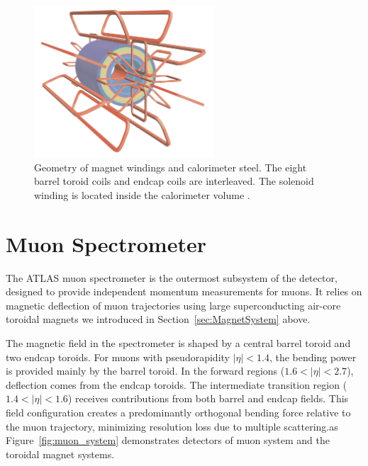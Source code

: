 \begin{figure}[htbp]
  \centering
  \includegraphics[width=0.6\textwidth]{figs/chapter2/magnet_windings.png}
  \caption{Geometry of magnet windings and calorimeter steel. The eight barrel toroid coils and endcap coils are interleaved. The solenoid winding is located inside the calorimeter volume \cite{ATLASDetector2008}.}
  \label{fig:magnet_windings}
\end{figure}

\section{Muon Spectrometer} \label{sec:MuonSpectrometer}
The ATLAS muon spectrometer is the outermost subsystem of the detector, designed to provide independent momentum measurements for muons. It relies on magnetic deflection of muon trajectories using large superconducting air-core toroidal magnets we introduced in Section~\ref{sec:MagnetSystem} above.

The magnetic field in the spectrometer is shaped by a central barrel toroid and two endcap toroids. For muons with pseudorapidity $|\eta| < 1.4$, the bending power is provided mainly by the barrel toroid. In the forward regions ($1.6 < |\eta| < 2.7$), deflection comes from the endcap toroids. The intermediate transition region ($1.4 < |\eta| < 1.6$) receives contributions from both barrel and endcap fields. This field configuration creates a predominantly orthogonal bending force relative to the muon trajectory, minimizing resolution loss due to multiple scattering.as Figure~\ref{fig:muon_system} demonstrates detectors of muon system and the toroidal magnet systems.

